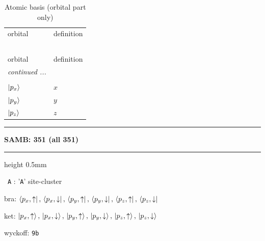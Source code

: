 \documentclass[fleqn,10pt,landscape]{jsarticle}
\begin{document}
\renewcommand{\arraystretch}{1.6}
\begin{longtable}[l]{ll}
\captionsetup{justification=raggedright, singlelinecheck=off}
\caption{Atomic basis (orbital part only)}
 \\
 \hline \hline
orbital & definition \\ \hline \endfirsthead

\multicolumn{1}{l}{\tablename\ \thetable{}} \\
 \hline \hline
orbital & definition \\ \hline \endhead

 \hline \hline
\multicolumn{1}{r}{\footnotesize\it continued ...} \\ \endfoot

 \hline \hline
\multicolumn{1}{r}{} \\ \endlastfoot

$ \ket{p_{x}} $ & $ x $ \\
$ \ket{p_{y}} $ & $ y $ \\
$ \ket{p_{z}} $ & $ z $ \\
\end{longtable}
\vspace{5mm}
\noindent \rule[0.5mm]{5mm}{0.5mm}\hspace{3mm}\textbf{SAMB: 351 (all 351)}\hspace{3mm}\leaders\hrule height 0.5mm\hfill\kern0pt
\vspace{3mm}

\vspace{5mm}

\noindent\textbullet\, \texttt{A} : '\texttt{A}' site-cluster

\noindent\quad * bra: $\bra{p_{x},\uparrow},\, \bra{p_{x},\downarrow},\, \bra{p_{y},\uparrow},\, \bra{p_{y},\downarrow},\, \bra{p_{z},\uparrow},\, \bra{p_{z},\downarrow}$

\noindent\quad * ket: $\ket{p_{x},\uparrow},\, \ket{p_{x},\downarrow},\, \ket{p_{y},\uparrow},\, \ket{p_{y},\downarrow},\, \ket{p_{z},\uparrow},\, \ket{p_{z},\downarrow}$

\noindent\quad * wyckoff: \texttt{9b}
\end{document}
